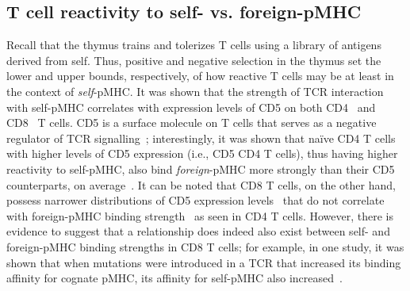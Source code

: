 \subsection{T cell reactivity to self- vs. foreign-pMHC}
\label{sec:intro_affinity_selfVsForeign}

Recall that the thymus trains and tolerizes T cells using a library of antigens derived from self. Thus, positive and negative selection in the thymus set the lower and upper bounds, respectively, of how reactive T cells may be at least in the context of \textit{self}-pMHC. It was shown that the strength of TCR interaction with self-pMHC correlates with expression levels of CD5 on both CD4\pos{}~\cite{azzam1998cd5,mandl2013t} and CD8\pos{}~\cite{fulton2015tcr} T cells. CD5 is a surface molecule on T cells that serves as a negative regulator of TCR signalling~\cite{tarakhovsky1995role,hawiger2004immunological}; interestingly, it was shown that na\"{i}ve CD4\pos{} T cells with higher levels of CD5 expression (i.e., CD5 CD4\pos{} T cells), thus having higher reactivity to self-pMHC, also bind \textit{foreign}-pMHC more strongly than their CD5 counterparts, on average~\cite{mandl2013t,rogers2021pre}. It can be noted that CD8\pos{} T cells, on the other hand, possess narrower distributions of CD5 expression levels~\cite{azzam1998cd5,mandl2013t} that do not correlate with foreign-pMHC binding strength~\cite{fulton2015tcr} as seen in CD4\pos{} T cells. However, there is evidence to suggest that a relationship does indeed also exist between self- and foreign-pMHC binding strengths in CD8\pos{} T cells; for example, in one study, it was shown that when mutations were introduced in a TCR that increased its binding affinity for cognate pMHC, its affinity for self-pMHC also increased~\cite{holler2003tcrs}.

